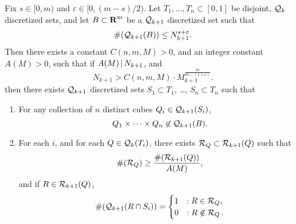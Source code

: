 \begin{theorem} \label{theorem059891891829}
    Fix $s \in [0,m)$ and $\varepsilon \in [0, (m-s)/2)$. Let $T_1, \dots, T_n \subset [0,1]$ be disjoint, $\operatorname{\mathcal{Q}}_k$ discretized sets, and let $B \subset \operatorname{\mathbf{R}}^m$ be a $\operatorname{\mathcal{Q}}_{k+1}$ discretized set such that
    \begin{equation} \label{equation6091904232093}
        \#(\operatorname{\mathcal{Q}}_{k+1}(B)) \leq N_{k+1}^{s + \varepsilon}.
    \end{equation}
    Then there exists a constant $C(n,m,M) > 0$, and an integer constant $A(M) > 0$, such that if $A(M) \operatorname{\mid} N_{k+1}$, and 
    \begin{equation} \label{equation19024u1298352389}
        N_{k+1} > C(n,m,M) \cdot M_{k+1}^{\frac{m}{m - (s + \varepsilon)}}.
    \end{equation}
    then there exists $\operatorname{\mathcal{Q}}_{k+1}$ discretized sets $S_1 \subset T_1$, \dots, $S_n \subset T_n$ such that
    \begin{enumerate}
        \item For any collection of $n$ distinct cubes $Q_i \in \operatorname{\mathcal{Q}}_{k+1}(S_i)$,
        \[ Q_1 \times \dots \times Q_n \not \in \operatorname{\mathcal{Q}}_{k+1}(B). \]

        \item For each $i$, and for each $Q \in \operatorname{\mathcal{Q}}_k(T_i)$, there exists $\operatorname{\mathcal{R}}_Q \subset \operatorname{\mathcal{R}}_{k+1}(Q)$ such that
        \[ \#(\operatorname{\mathcal{R}}_Q) \geq \frac{\#(\operatorname{\mathcal{R}}_{k+1}(Q))}{A(M)}, \]
        and if $R \in \operatorname{\mathcal{R}}_{k+1}(Q)$,
        \[ \#(\operatorname{\mathcal{Q}}_{k+1}(R \cap S_i)) = \begin{cases} 1 &: R \in \operatorname{\mathcal{R}}_Q, \\ 0 &: R \not \in \operatorname{\mathcal{R}}_Q. \end{cases} \]
    \end{enumerate}
\end{theorem}

